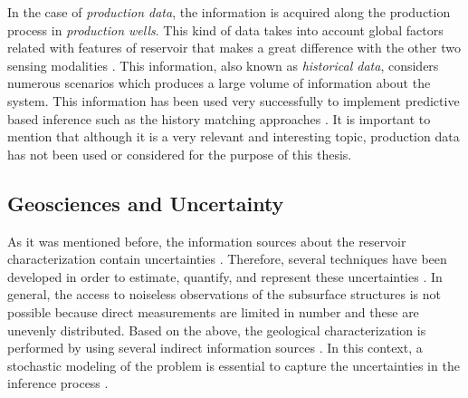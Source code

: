 In the case of \emph{production data}, the information is acquired along the production process in \emph{production wells}. This kind of data takes into account global factors related with features of reservoir that makes a great difference with the other two sensing modalities \citep{Oliver_2008_a, Strebelle_2004a, Man_2013_a, Raef_2015_a, Handwerger_2016_a, abellan_2010a}. This information, also known as \emph{historical data}, considers numerous scenarios which produces a large volume of information about the system. This information has been used very successfully to implement predictive based inference such as the history matching approaches \citep{kitanidis_1997_a, Oliver_2008_a, Scheidt2009_a}. It is important to mention that although it is a very relevant and interesting topic, production data has not been used or considered for the purpose of this thesis.



\subsection{Geosciences and Uncertainty}

As it was mentioned before, the information sources about the reservoir characterization contain uncertainties \citep{Onwunalu09,GuyagulerBaris2002_a,wellman_2013}. Therefore, several techniques have been developed in order to estimate, quantify, and represent these uncertainties \citep{Bangerth_2006,Krause_2008b}. In general, the access to noiseless observations of the subsurface structures is not possible because direct measurements are limited in number and these are unevenly distributed. Based on the above, the geological characterization is performed by using several indirect information sources \citep{kitanidis_1997_a,Oliver_2008_a}. In this context, a stochastic modeling of the problem is essential to capture the uncertainties in the inference process \citep{Bangerth_2006}.

